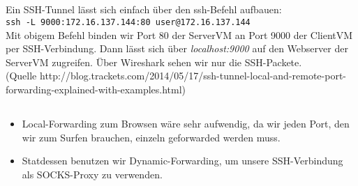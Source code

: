 \documentclass{scrartcl}
\begin{document}
\begin{enumerate}[\bfseries 1.]
\subsection{}
\label{sub:4.2}
Ein SSH-Tunnel lässt sich einfach über den ssh-Befehl aufbauen: \\
\texttt{ssh -L 9000:172.16.137.144:80 user@172.16.137.144}\\
Mit obigem Befehl binden wir Port 80 der ServerVM an Port 9000 der ClientVM
per SSH-Verbindung. Dann lässt sich über \textit{localhost:9000} auf den
Webserver der ServerVM zugreifen. Über Wireshark sehen wir nur die
SSH-Packete.\\
(Quelle http://blog.trackets.com/2014/05/17/ssh-tunnel-local-and-remote-port-forwarding-explained-with-examples.html)

\subsection{}
\label{sub:4.3}
\begin{itemize}
  \item Local-Forwarding zum Browsen wäre sehr aufwendig, da wir jeden Port, den
  wir zum Surfen brauchen, einzeln geforwarded werden muss.
  \item Statdessen benutzen wir Dynamic-Forwarding, um unsere SSH-Verbindung als
  SOCKS-Proxy zu verwenden.
\end{itemize}
\end{enumerate}
\end{document}
